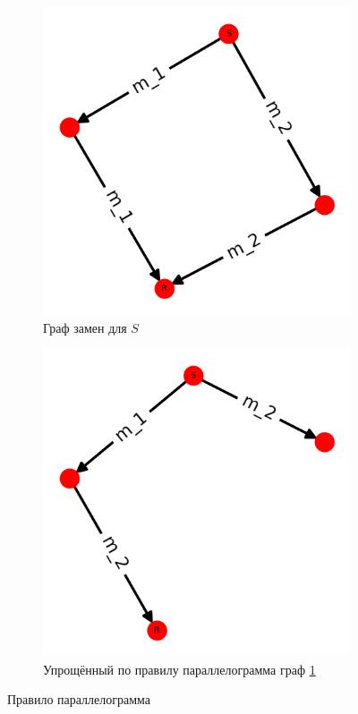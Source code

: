 \begin{figure}
\begin{subfigure}{.4\textwidth}
  \centering
  \includegraphics[width=0.8\linewidth]{chapters/images/parallel.png}  
  \caption{Граф замен для $S$}
  \label{fig:parallel-replacement-graph}
\end{subfigure}
\begin{subfigure}{.4\textwidth}
  \centering
  \includegraphics[width=0.8\linewidth]{chapters/images/parallel_red.png}  
  \caption{Упрощённый по правилу параллелограмма граф \ref{fig:parallel-replacement-graph}}
  \label{fig:parallel-replacement-graph-red}
\end{subfigure}
\caption{Правило параллелограмма}
\label{fig:parallel-rule}
\end{figure}

